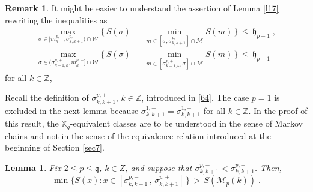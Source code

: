 \documentclass[reqno]{amsart}
\theoremstyle{plain}
\newtheorem{lemma}[theorem]{Lemma}
\theoremstyle{definition}
\newtheorem{remark}[theorem]{Remark}
\newcommand{\mc}[1]{{\mathcal #1}}
\newcommand{\mf}[1]{{\mathfrak #1}}
\newcommand{\bb}[1]{{\mathbb #1}}
\newcommand{\ms}[1]{{\mathscr #1}}
\newcounter{as}[section]
\newcommand{\<}{\langle}
\renewcommand{\>}{\rangle}
\begin{document}
\begin{remark}
\label{l17b}
It might be easier to understand the assertion of Lemma \ref{l17}
rewriting the inequalities as 
\begin{equation*}
\begin{gathered}
\max_{\sigma \in [m^{p,-}_{k}, \sigma^{p,-}_{k,k+1})  \cap \mc W}
\Big\{\, S(\sigma) \,-\, 
\min_{m\in [\sigma, \sigma^{p,-}_{k,k+1}] \cap \mc M} S(m)\,\Big\}
\,\le\, \mf h_{p-1} \;,
\\
\max_{\sigma \in (\sigma^{p,+}_{k-1,k} , m^{p,+}_{k}]  \cap \mc W}
\Big\{\, S(\sigma) \,-\, 
\min_{m\in [\sigma^{p,+}_{k-1,k} , \sigma] \cap \mc M} S(m)\,\Big\}
\,\le\, \mf h_{p-1} 
\end{gathered}
\end{equation*}
for all $k\in \bb Z$,
\end{remark}

Recall the definition of $\sigma^{p,\pm}_{k,k+1}$, $k\in \bb Z$,
introduced in \eqref{64}. The case $p=1$ is excluded in the next lemma
because $\sigma^{1,-}_{k,k+1} =\sigma^{1,+}_{k,k+1}$ for all
$k\in \bb Z$. In the proof of this result, the $\bb X_q$-equivalent
classes are to be understood in the sense of Markov chains and not in
the sense of the equivalence relation introduced at the beginning of
Section \ref{sec7}.


\begin{lemma}
\label{l27}
Fix $2\le p\le \mf q$, $k\in Z$, and suppose that $\sigma^{p,-}_{k,k+1}
<\sigma^{p,+}_{k,k+1}$. Then,
\begin{equation*}
\min \big\{ S(x) : x \in
[\sigma^{p,-}_{k,k+1} \,,\, \sigma^{p,+}_{k,k+1} ] \,\big\} \, >\,
S(\ms M_{p}(k)) \;.
\end{equation*}
\end{lemma}
\end{document}
